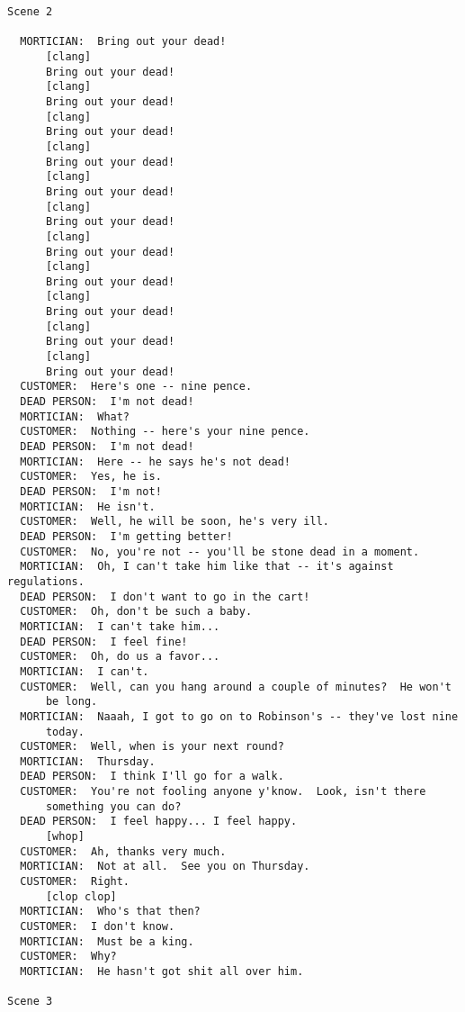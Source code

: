 \documentclass{article}
\begin{document}
\begin{verbatim}
Scene 2

  MORTICIAN:  Bring out your dead!
      [clang]
      Bring out your dead!
      [clang]
      Bring out your dead!
      [clang]
      Bring out your dead!
      [clang]
      Bring out your dead!
      [clang]
      Bring out your dead!
      [clang]
      Bring out your dead!
      [clang]
      Bring out your dead!
      [clang]
      Bring out your dead!
      [clang]
      Bring out your dead!
      [clang]
      Bring out your dead!
      [clang]
      Bring out your dead!
  CUSTOMER:  Here's one -- nine pence.
  DEAD PERSON:  I'm not dead!
  MORTICIAN:  What?
  CUSTOMER:  Nothing -- here's your nine pence.
  DEAD PERSON:  I'm not dead!
  MORTICIAN:  Here -- he says he's not dead!
  CUSTOMER:  Yes, he is.
  DEAD PERSON:  I'm not!
  MORTICIAN:  He isn't.
  CUSTOMER:  Well, he will be soon, he's very ill.
  DEAD PERSON:  I'm getting better!
  CUSTOMER:  No, you're not -- you'll be stone dead in a moment.
  MORTICIAN:  Oh, I can't take him like that -- it's against regulations.
  DEAD PERSON:  I don't want to go in the cart!
  CUSTOMER:  Oh, don't be such a baby.
  MORTICIAN:  I can't take him...
  DEAD PERSON:  I feel fine!
  CUSTOMER:  Oh, do us a favor...
  MORTICIAN:  I can't.
  CUSTOMER:  Well, can you hang around a couple of minutes?  He won't
      be long.
  MORTICIAN:  Naaah, I got to go on to Robinson's -- they've lost nine
      today.
  CUSTOMER:  Well, when is your next round?
  MORTICIAN:  Thursday.
  DEAD PERSON:  I think I'll go for a walk.
  CUSTOMER:  You're not fooling anyone y'know.  Look, isn't there
      something you can do?
  DEAD PERSON:  I feel happy... I feel happy.
      [whop]
  CUSTOMER:  Ah, thanks very much.
  MORTICIAN:  Not at all.  See you on Thursday.
  CUSTOMER:  Right.
      [clop clop]
  MORTICIAN:  Who's that then?
  CUSTOMER:  I don't know.
  MORTICIAN:  Must be a king.
  CUSTOMER:  Why?
  MORTICIAN:  He hasn't got shit all over him.

Scene 3


\end{verbatim}
\end{document}
